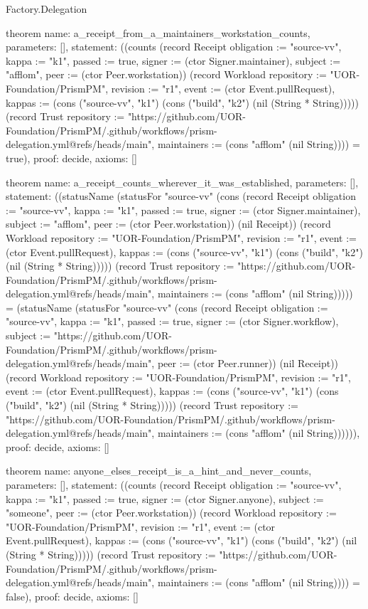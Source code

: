 \begin{lexlean}{Factory.Delegation}
\begin{semanticmodule}
theorem{
  name: a_receipt_from_a_maintainers_workstation_counts,
  parameters: [],
  statement: ((counts (record Receipt {obligation := "source-vv", kappa := "k1", passed := true, signer := (ctor Signer.maintainer), subject := "afflom", peer := (ctor Peer.workstation)}) (record Workload {repository := "UOR-Foundation/PrismPM", revision := "r1", event := (ctor Event.pullRequest), kappas := (cons ("source-vv", "k1") (cons ("build", "k2") (nil (String * String))))}) (record Trust {repository := "https://github.com/UOR-Foundation/PrismPM/.github/workflows/prism-delegation.yml@refs/heads/main", maintainers := (cons "afflom" (nil String))})) = true),
  proof: decide{},
  axioms: []
}

theorem{
  name: a_receipt_counts_wherever_it_was_established,
  parameters: [],
  statement: ((statusName (statusFor "source-vv" (cons (record Receipt {obligation := "source-vv", kappa := "k1", passed := true, signer := (ctor Signer.maintainer), subject := "afflom", peer := (ctor Peer.workstation)}) (nil Receipt)) (record Workload {repository := "UOR-Foundation/PrismPM", revision := "r1", event := (ctor Event.pullRequest), kappas := (cons ("source-vv", "k1") (cons ("build", "k2") (nil (String * String))))}) (record Trust {repository := "https://github.com/UOR-Foundation/PrismPM/.github/workflows/prism-delegation.yml@refs/heads/main", maintainers := (cons "afflom" (nil String))}))) = (statusName (statusFor "source-vv" (cons (record Receipt {obligation := "source-vv", kappa := "k1", passed := true, signer := (ctor Signer.workflow), subject := "https://github.com/UOR-Foundation/PrismPM/.github/workflows/prism-delegation.yml@refs/heads/main", peer := (ctor Peer.runner)}) (nil Receipt)) (record Workload {repository := "UOR-Foundation/PrismPM", revision := "r1", event := (ctor Event.pullRequest), kappas := (cons ("source-vv", "k1") (cons ("build", "k2") (nil (String * String))))}) (record Trust {repository := "https://github.com/UOR-Foundation/PrismPM/.github/workflows/prism-delegation.yml@refs/heads/main", maintainers := (cons "afflom" (nil String))})))),
  proof: decide{},
  axioms: []
}

theorem{
  name: anyone_elses_receipt_is_a_hint_and_never_counts,
  parameters: [],
  statement: ((counts (record Receipt {obligation := "source-vv", kappa := "k1", passed := true, signer := (ctor Signer.anyone), subject := "someone", peer := (ctor Peer.workstation)}) (record Workload {repository := "UOR-Foundation/PrismPM", revision := "r1", event := (ctor Event.pullRequest), kappas := (cons ("source-vv", "k1") (cons ("build", "k2") (nil (String * String))))}) (record Trust {repository := "https://github.com/UOR-Foundation/PrismPM/.github/workflows/prism-delegation.yml@refs/heads/main", maintainers := (cons "afflom" (nil String))})) = false),
  proof: decide{},
  axioms: []
}


\end{semanticmodule}
\end{lexlean}
